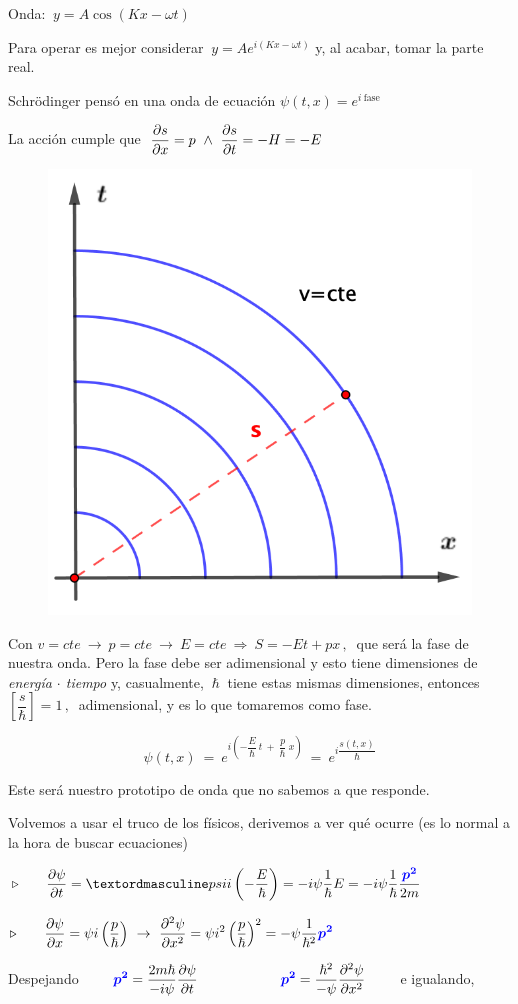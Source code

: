 \begin{multicols}{2}
Onda: $\ y=A\cos(Kx-\omega t)$

Para operar es mejor considerar $\ y=Ae^{i(Kx-\omega t)}$ y, al acabar, tomar la parte real.

Schrödinger pensó en una onda de ecuación $\psi(t,x)=e^{i\ \text{fase}}$

La acción cumple que $\ \displaystyle \pdv{s}{x}=p \ \wedge \ \pdv{s}{t}=-H=-E$

\begin{figure}[H]
	\centering
	\includegraphics[width=.3\textwidth]{imagenes/img26-02.png}
\end{figure}	
\end{multicols}

Con $v=cte \ \to \ p=cte \ \to \ E=cte \ \Rightarrow \ S=-Et+px\, ,  \ $ que será la fase de nuestra onda. Pero la fase debe ser adimensional y esto tiene dimensiones de \emph{energía $\cdot$ tiempo} y, casualmente, $\ \hbar \ $ tiene estas mismas dimensiones, entonces $\left[ \dfrac s \hbar \right] = 1 \, , \ $ adimensional, y es lo que tomaremos como fase.

$$ \psi(t,x) \ = \ e^{i \left( -\dfrac E \hbar \ t \ + \ \dfrac p \hbar \ x \right)} \ = \ e^{i \dfrac {s(t,x)}{\hbar}}$$

Este será nuestro prototipo de onda que no sabemos a que responde.

Volvemos a usar el truco de los físicos, derivemos a ver qué ocurre \textcolor{gris}{(es lo normal a la hora de buscar ecuaciones)}

$\triangleright \qquad \displaystyle \pdv{\psi}{t}=ºpsi i \left( -\dfrac E \hbar \right) =-i \psi \dfrac 1 \hbar E=-i \psi \dfrac 1 \hbar \dfrac {\textcolor{blue}{\boldsymbol{ p^2 }} }{2m}$

$\triangleright \qquad \displaystyle \pdv{\psi}{x}=\psi i \left( \dfrac p \hbar \right) \ \to \  
\displaystyle \pdv[2]{\psi}{x}=\psi i^2 \left( \dfrac p \hbar \right)^2 =  - \psi \dfrac 1{\hbar^2} \textcolor{blue}{\boldsymbol{ p^2}}$


Despejando $\qquad \displaystyle \textcolor{blue}{\boldsymbol{p^2}}=\dfrac{2m\hbar}{-i\psi} \pdv{\psi}{t} \qquad \qquad \qquad \textcolor{blue}{\boldsymbol{p^2}} = \dfrac{\hbar^2}{-\psi} \pdv[2]{\psi}{x} \qquad $ e igualando,

